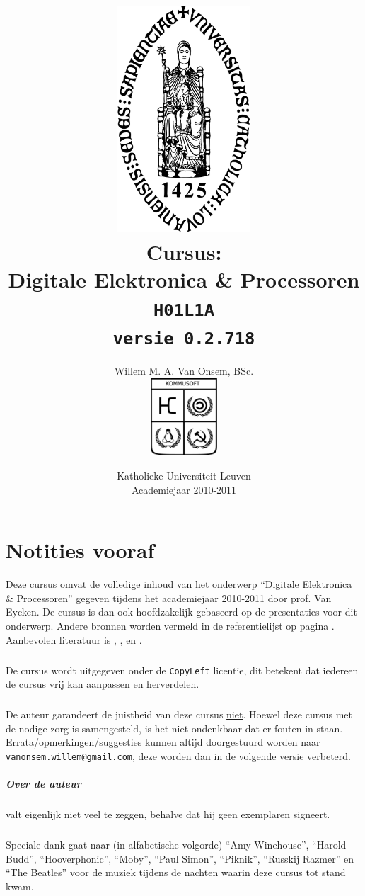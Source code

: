 \documentclass[a4paper,10pt,titlepage]{book}
\title{\includegraphics[width=5cm]{../SharedData/sedes.pdf}\\Cursus:\\Digitale Elektronica \& Processoren\\\texttt{H01L1A}\\\texttt{\small versie 0.2.718}}
\author{Willem M. A. Van Onsem, BSc.\\\includegraphics[width=2.5cm]{../SharedData/kommusoftEmblema.pdf}}
\date{Katholieke Universiteit Leuven\\Academiejaar 2010-2011}
\begin{document}
\frontmatter
\begin{titlepage}
\maketitle
\end{titlepage}
\tableofcontents
\chapter*{Notities vooraf}
\begin{it}
Deze cursus omvat de volledige inhoud van het onderwerp ``Digitale Elektronica \& Processoren'' gegeven tijdens het academiejaar 2010-2011 door prof. Van Eycken. De cursus is dan ook hoofdzakelijk gebaseerd op de presentaties voor dit onderwerp. Andere bronnen worden vermeld in de referentielijst op pagina \pageref{reference}. Aanbevolen literatuur is \cite{brown2004fundamentals}, \cite{gajski1997principles}, \cite{wakerly2000digital} en \cite{ashenden2008designer}.
\paragraph{}
De cursus wordt uitgegeven onder de \texttt{CopyLeft} licentie, dit betekent dat iedereen de cursus vrij kan aanpassen en herverdelen.
\paragraph{}
De auteur garandeert de juistheid van deze cursus \underline{niet}. Hoewel deze cursus met de nodige zorg is samengesteld, is het niet ondenkbaar dat er fouten in staan. Errata/opmerkingen/suggesties kunnen altijd doorgestuurd worden naar \verb+vanonsem.willem@gmail.com+, deze worden dan in de volgende versie verbeterd.
\paragraph{Over de auteur}
valt eigenlijk niet veel te zeggen, behalve dat hij geen exemplaren signeert.
\paragraph{}
Speciale dank gaat naar (in alfabetische volgorde) ``Amy Winehouse'', ``Harold Budd'', ``Hooverphonic'', ``Moby'', ``Paul Simon'', ``Piknik'', ``Russkij Razmer'' en ``The Beatles'' voor de muziek tijdens de nachten waarin deze cursus tot stand kwam.

\end{it}
\end{document}
